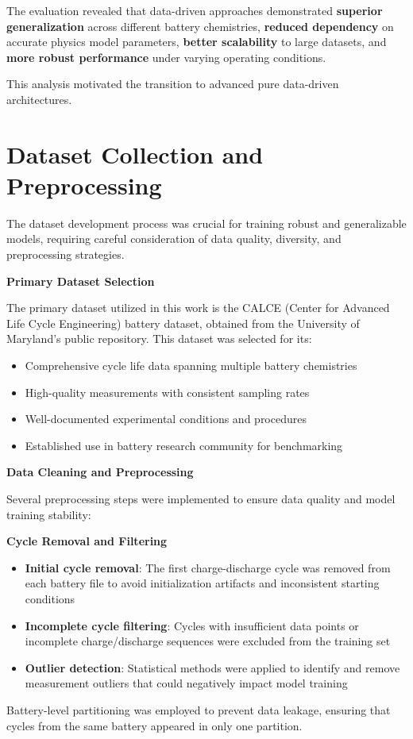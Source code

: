 The evaluation revealed that data-driven approaches demonstrated \textbf{superior generalization} across different battery chemistries, \textbf{reduced dependency} on accurate physics model parameters, \textbf{better scalability} to large datasets, and \textbf{more robust performance} under varying operating conditions.

This analysis motivated the transition to advanced pure data-driven architectures.

\section{Dataset Collection and Preprocessing}

The dataset development process was crucial for training robust and generalizable models, requiring careful consideration of data quality, diversity, and preprocessing strategies.

\textbf{Primary Dataset Selection}

The primary dataset utilized in this work is the CALCE (Center for Advanced Life Cycle Engineering) battery dataset, obtained from the University of Maryland's public repository. This dataset was selected for its:

\begin{itemize}
    \item Comprehensive cycle life data spanning multiple battery chemistries
    \item High-quality measurements with consistent sampling rates
    \item Well-documented experimental conditions and procedures
    \item Established use in battery research community for benchmarking
\end{itemize}

\textbf{Data Cleaning and Preprocessing}

Several preprocessing steps were implemented to ensure data quality and model training stability:

\textbf{Cycle Removal and Filtering}

\begin{itemize}
    \item \textbf{Initial cycle removal}: The first charge-discharge cycle was removed from each battery file to avoid initialization artifacts and inconsistent starting conditions
    \item \textbf{Incomplete cycle filtering}: Cycles with insufficient data points or incomplete charge/discharge sequences were excluded from the training set
    \item \textbf{Outlier detection}: Statistical methods were applied to identify and remove measurement outliers that could negatively impact model training
\end{itemize}
Battery-level partitioning was employed to prevent data leakage, ensuring that cycles from the same battery appeared in only one partition.

